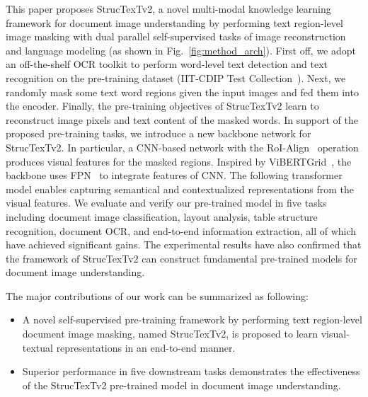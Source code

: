 \documentclass{article} \usepackage{iclr2023_conference,times}
\begin{document}
This paper proposes StrucTexTv2, a novel multi-modal knowledge learning framework for document image understanding by performing text region-level image masking with dual parallel self-supervised tasks of image reconstruction and language modeling (as shown in Fig.~\ref{fig:method_arch}). First off, we adopt an off-the-shelf OCR toolkit to perform word-level text detection and text recognition on the pre-training dataset (IIT-CDIP Test Collection~\cite{sigir06cdip}). Next, we randomly mask some text word regions given the input images and fed them into the encoder. Finally, the pre-training objectives of StrucTexTv2 learn to reconstruct image pixels and text content of the masked words. In support of the proposed pre-training tasks, we introduce a new backbone network for StrucTexTv2. In particular, a CNN-based network with the RoI-Align~\cite{he2017mask} operation produces visual features for the masked regions. Inspired by ViBERTGrid~\cite{lin2021vibertgrid}, the backbone uses FPN~\cite{lin2017feature} to integrate features of CNN. The following transformer model enables capturing semantical and contextualized representations from the visual features. We evaluate and verify our pre-trained model in five tasks including document image classification, layout analysis, table structure recognition, document OCR, and end-to-end information extraction, all of which have achieved significant gains. The experimental results have also confirmed that the framework of StrucTexTv2 can construct fundamental pre-trained models for document image understanding.

The major contributions of our work can be summarized as following:
\begin{itemize}
 \item A novel self-supervised pre-training framework by performing text region-level document image masking, named StrucTexTv2, is proposed to learn visual-textual representations in an end-to-end manner.
 
 \item Superior performance in five downstream tasks demonstrates the effectiveness of the StrucTexTv2 pre-trained model in document image understanding.
\end{itemize}
\end{document}
